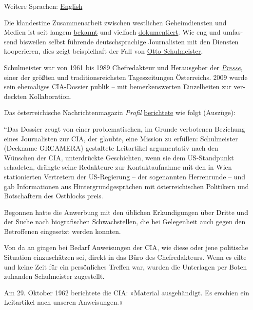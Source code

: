 Weitere Sprachen:
\href{https://swprs.org/the-editor-in-chief-and-the-cia/}{English}

Die klandestine Zu­sam­men­arbeit zwischen west­lichen Geheim­diensten
und Medien ist seit langem
\href{http://carlbernstein.com/magazine_cia_and_media.php}{bekannt} und
vielfach
\href{http://www.amazon.de/Geheimdienst-Politik-Medien-Meinungsmache-Zeitgeschichte/dp/3897068796}{dokumentiert}.
Wie eng und um­fas­send bisweilen selbst füh­ren­de
deutsch­­­spra­­chige Jour­na­listen mit den Diens­ten kooperieren, dies
zeigt bei­spiel­haft der Fall von
\href{https://de.wikipedia.org/wiki/Otto_Schulmeister}{Otto
Schul­meister}.

Schul­meister war von 1961 bis 1989 Chef­re­dak­teur und Herausgeber der
\href{https://de.wikipedia.org/wiki/Die_Presse}{\emph{Presse}}, einer
der größ­ten und tra­di­tions­reich­sten Tages­­zeitungen Öster­reichs.
2009 wurde sein ehemaliges CIA-Dossier publik -- mit bemerkenswerten
Einzel­heiten zur ver­deckten Kol­la­bo­ration.

Das österreichische Nachrichten­magazin \emph{Profil}
\href{https://www.profil.at/home/ex-presse-chef-dienste-cia-otto-schulmeister-geheimdienst-239634}{berichtete}
wie folgt (Auszüge):

``Das Dossier zeugt von einer proble­ma­tischen, im Grunde ver­botenen
Be­zie­hung eines Jour­­na­listen zur CIA, der glaubte, eine Mission zu
erfüllen: Schulmeister (Deckname GRCAMERA) gestaltete Leit­artikel
argumentativ nach den Wünschen der CIA, unterdrückte Geschichten, wenn
sie dem US-Standpunkt schadeten, drängte seine Redakteure zur
Kontakt­aufnahme mit den in Wien statio­nier­ten Vertretern der
US-Regierung -- der sogenannten Herrenrunde -- und gab Informationen aus
Hinter­­grund­­ge­sprächen mit österreichischen Politikern und
Botschaftern des Ostblocks preis.

Begonnen hatte die Anwerbung mit den üblichen Erkundigungen über Dritte
und der Suche nach biografischen Schwach­stellen, die bei Gelegen­heit
auch gegen den Betroffenen eingesetzt werden konnten.

Von da an gingen bei Bedarf Anweisungen der CIA, wie diese oder jene
politische Situation einzuschätzen sei, direkt in das Büro des
Chef­redakteurs. Wenn es eilte und keine Zeit für ein persönliches
Treffen war, wurden die Unterlagen per Boten zuhanden Schulmeister
zugestellt.

Am 29. Oktober 1962 berichtete die CIA: »Material ausgehändigt. Es
erschien ein Leitartikel nach unseren Anweisungen.«


